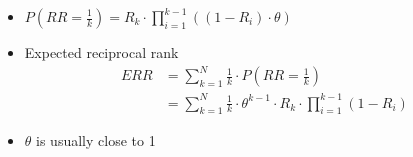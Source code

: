 \begin{itemize}
\begin{itemize}
\begin{itemize}
            \item{ $P\left(R R=\frac{1}{k}\right)=R_{k} \cdot \prod_{i=1}^{k-1}\left(\left(1-R_{i}\right) \cdot \theta\right)$}
            \item Expected reciprocal rank
            $$
            \begin{aligned}
            ERR &= \sum^N_{k=1} \frac{1}{k} \cdot P(RR = \frac{1}{k}) \\
            &= \sum^N_{k=1} \frac{1}{k} \cdot \theta^{k-1} \cdot R_k \cdot \prod^{k-1}_{i=1} (1 - R_i)
            \end{aligned}
            $$
            \item $\theta$ is usually close to 1
        \end{itemize}
    \end{itemize}
\end{itemize}


\newpage